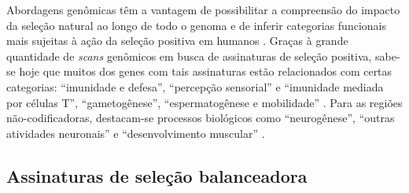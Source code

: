 \begin{refsection}
	Abordagens genômicas têm a vantagem de possibilitar a compreensão do impacto da seleção natural ao longo de todo o genoma e de inferir categorias funcionais mais sujeitas à ação da seleção positiva em humanos \parencite{Sabeti2006}. Graças à grande quantidade de \emph{scans} genômicos em busca de assinaturas de seleção positiva, sabe-se hoje que muitos dos genes com tais assinaturas estão relacionados com certas categorias: \enquote{imunidade e defesa}, \enquote{percepção sensorial} e \enquote{imunidade mediada por células T}, \enquote{gametogênese}, \enquote{espermatogênese e mobilidade} \parencite{Harris2006,Nielsen2005a}. Para as regiões não-codificadoras, destacam-se processos biológicos como \enquote{neurogênese}, \enquote{outras atividades neuronais} e \enquote{desenvolvimento muscular} \parencite{Haygood2010}.


\subsection{Assinaturas de seleção balanceadora} %



\end{refsection}
